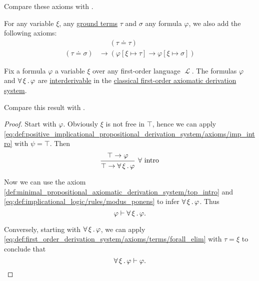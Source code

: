 \begin{definition}
\begin{itemize}
\begin{thmenum}[resume=def:first_order_derivation_system]
      Compare these axioms with .

       For any variable \( \xi \), any \hyperref[def:first_order_syntax/ground_term]{ground terms} \( \tau \) and \( \sigma \) any formula \( \varphi \), we also add the following axioms:
      \begin{equation}\label{eq:def:first_order_derivation_system/axioms/equality}
        \begin{aligned}
                               &\phantom{{}\rightarrow{}} (\tau \doteq \tau) \\
          (\tau \doteq \sigma) &\rightarrow (\varphi[\xi \mapsto \tau] \rightarrow \varphi[\xi \mapsto \sigma])
        \end{aligned}
      \end{equation}
    \end{thmenum}
  \end{itemize}
\end{definition}

\begin{proposition}\label{thm:syntactic_implicit_universal_quantification}
  Fix a formula \( \varphi \) a variable \( \xi \) over any first-order language \( \mscrL \). The formulas \( \varphi \) and \( \forall \thinspace \xi \thinspace . \thinspace \varphi \) are \hyperref[def:first_order_semantics/interderivable]{interderivable} in the \hyperref[def:first_order_derivation_system]{classical first-order axiomatic derivation system}.

  Compare this result with .
\end{proposition}
\begin{proof}
  Start with \( \varphi \). Obviously \( \xi \) is not free in \( \top \), hence we can apply \eqref{eq:def:positive_implicational_propositional_derivation_system/axioms/imp_intro} with \( \psi = \top \). Then
  \begin{equation*}
    \begin{prooftree}
      \hypo{\top \rightarrow \varphi}
      \infer1[\( \forall \) intro]{\top \rightarrow \qforall \xi \varphi}
    \end{prooftree}
  \end{equation*}

  Now we can use the axiom \eqref{def:minimal_propositional_axiomatic_derivation_system/top_intro} and \eqref{eq:def:implicational_logic/rules/modus_ponens} to infer \( \forall \thinspace \xi \thinspace . \thinspace \varphi \). Thus
  \begin{equation*}
    \varphi \vdash \forall \thinspace \xi \thinspace . \thinspace \varphi.
  \end{equation*}

  Conversely, starting with \( \forall \thinspace \xi \thinspace . \thinspace \varphi \), we can apply \eqref{eq:def:first_order_derivation_system/axioms/terms/forall_elim} with \( \tau = \xi \) to conclude that
  \begin{equation*}
    \forall \thinspace \xi \thinspace . \thinspace \varphi \vdash \varphi.
  \end{equation*}
\end{proof}

